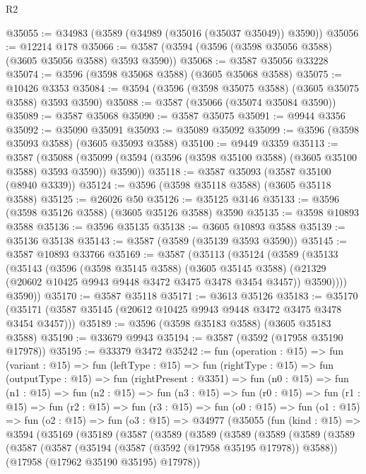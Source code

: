 \begin{lexlean}{R2}
\begin{coremodule}
@35055 := @34983 (@3589 (@34989 (@35016 (@35037 @35049)) @3590))
@35056 := @12214 @178
@35066 := @3587 (@3594 (@3596 (@3598 @35056 @3588) (@3605 @35056 @3588) @3593 @3590))
@35068 := @3587 @35056 @33228
@35074 := @3596 (@3598 @35068 @3588) (@3605 @35068 @3588)
@35075 := @10426 @3353
@35084 := @3594 (@3596 (@3598 @35075 @3588) (@3605 @35075 @3588) @3593 @3590)
@35088 := @3587 (@35066 (@35074 @35084 @3590))
@35089 := @3587 @35068
@35090 := @3587 @35075
@35091 := @9944 @3356
@35092 := @35090 @35091
@35093 := @35089 @35092
@35099 := @3596 (@3598 @35093 @3588) (@3605 @35093 @3588)
@35100 := @9449 @3359
@35113 := @3587
    (@35088 (@35099 (@3594 (@3596 (@3598 @35100 @3588) (@3605 @35100 @3588) @3593 @3590)) @3590))
@35118 := @3587 @35093 (@3587 @35100 (@8940 @3339))
@35124 := @3596 (@3598 @35118 @3588) (@3605 @35118 @3588)
@35125 := @26026 @50
@35126 := @35125 @3146
@35133 := @3596 (@3598 @35126 @3588) (@3605 @35126 @3588) @3590
@35135 := @3598 @10893 @3588
@35136 := @3596 @35135
@35138 := @3605 @10893 @3588
@35139 := @35136 @35138
@35143 := @3587 (@3589 (@35139 @3593 @3590))
@35145 := @3587 @10893 @33766
@35169 := @3587
    (@35113
      (@35124
        (@3589
          (@35133
            (@35143
              (@3596
                (@3598 @35145 @3588)
                (@3605 @35145 @3588)
                (@21329 (@20602 @10425 @9943 @9448 @3472 @3475 @3478 @3454 @3457))
                @3590))))
        @3590))
@35170 := @3587 @35118
@35171 := @3613 @35126
@35183 := @35170 (@35171 (@3587 @35145 (@20612 @10425 @9943 @9448 @3472 @3475 @3478 @3454 @3457)))
@35189 := @3596 (@3598 @35183 @3588) (@3605 @35183 @3588)
@35190 := @33679 @9943
@35194 := @3587 (@3592 (@17958 @35190 @17978))
@35195 := @33379 @3472
@35242 := fun (operation : @15) =>
  fun (variant : @15) =>
  fun (leftType : @15) =>
  fun (rightType : @15) =>
  fun (outputType : @15) =>
  fun (rightPresent : @3351) =>
  fun (n0 : @15) =>
  fun (n1 : @15) =>
  fun (n2 : @15) =>
  fun (n3 : @15) =>
  fun (r0 : @15) =>
  fun (r1 : @15) =>
  fun (r2 : @15) =>
  fun (r3 : @15) =>
  fun (o0 : @15) =>
  fun (o1 : @15) =>
  fun (o2 : @15) =>
  fun (o3 : @15) =>
  @34977
    (@35055
      (fun (kind : @15) =>
      @3594
        (@35169
          (@35189
            (@3587
              (@3589
                (@3589
                  (@3589
                    (@3589
                      (@3589
                        (@3589
                          (@3587
                            (@3587
                              (@35194 (@3587 (@3592 (@17958 @35195 @17978)) @3588))
                              (@17958 (@17962 @35190 @35195) @17978))

\end{coremodule}
\end{lexlean}
